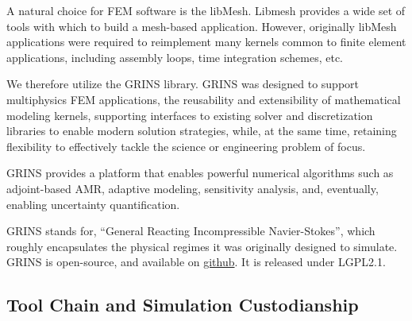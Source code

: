 A natural choice for FEM software is the
libMesh\cite{libMeshPaper}. Libmesh provides a wide set of tools with
which to build a mesh-based application. However, originally libMesh
applications were required to reimplement many kernels common to finite
element applications, including assembly loops, time integration
schemes, etc.  

We therefore utilize the GRINS library\cite{GRINSpaper}.
GRINS was designed to support multiphysics FEM
applications, the reusability and extensibility of mathematical
modeling kernels, supporting interfaces to existing solver and
discretization libraries to enable modern solution strategies, while, at
the same time, retaining flexibility to effectively tackle the science
or engineering problem of focus. 

GRINS provides a platform that enables powerful numerical algorithms
such as adjoint-based AMR, adaptive modeling, sensitivity analysis,
and, eventually, enabling uncertainty quantification.

GRINS stands for, ``General Reacting Incompressible Navier-Stokes'',
which roughly encapsulates the physical regimes it was originally
designed to simulate. GRINS is open-source, and available on
\hyperref[www.github.com/grinsfem/grins]{github}. It is released 
under LGPL2.1.  






\subsection{Tool Chain and Simulation Custodianship}

